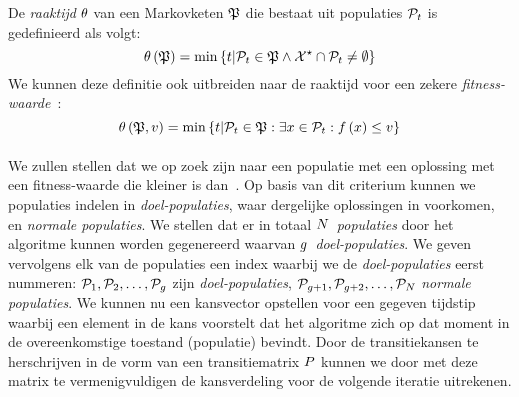 \begin{definition}
De \emph{raaktijd} $\theta$ van een Markovketen $\mathfrak{P}$ die bestaat uit populaties $\mathcal{P}_t$ is gedefinieerd als volgt:
\begin{equation}
\theta\left(\mathfrak{P}\right)=\min\left\{ t|\mathcal{P}_t\in\mathfrak{P}\wedge\mathcal{X}^{\star}\cap \mathcal{P}_t\neq\emptyset\right\}
\end{equation}
We kunnen deze definitie ook uitbreiden naar de raaktijd voor een zekere \emph{fitness-waarde}~\fitnessval:
\begin{equation}
\theta\left(\mathfrak{P},v\right)=\min\left\{ t|\mathcal{P}_t\in\mathfrak{P}:\exists x\in \mathcal{P}_t:f\left(x\right)\leq v\right\}
\end{equation}
\end{definition}

\paragraph{}
We zullen stellen dat we op zoek zijn naar een populatie met een oplossing met een fitness-waarde die kleiner is dan~\fitnessval. Op basis van dit criterium kunnen we populaties indelen in \emph{doel-populaties}, waar dergelijke oplossingen in voorkomen, en \emph{normale populaties}. We stellen dat er in totaal $N$~\emph{populaties} door het algoritme kunnen worden gegenereerd waarvan $g$~\emph{doel-populaties}. We geven vervolgens elk van de populaties een index waarbij we de \emph{doel-populaties} eerst nummeren: $\mathcal{P}_1,\mathcal{P}_2,\ldots,\mathcal{P}_{g}$ zijn \emph{doel-populaties}, $\mathcal{P}_{g+1},\mathcal{P}_{g+2},\ldots,\mathcal{P}_{N}$ \emph{normale populaties}. We kunnen nu een kansvector  opstellen voor een gegeven tijdstip waarbij een element in  de kans voorstelt dat het algoritme zich op dat moment in de overeenkomstige toestand (populatie) bevindt. Door de transitiekansen te herschrijven in de vorm van een transitiematrix $P$ kunnen we door  met deze matrix te vermenigvuldigen de kansverdeling voor de volgende iteratie uitrekenen.


